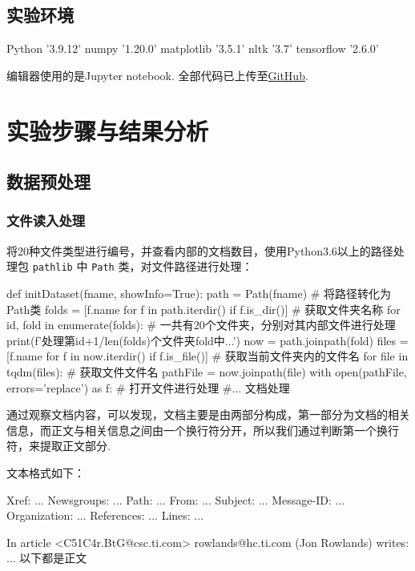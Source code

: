 \documentclass[12pt, a4paper, oneside]{ctexart}
\numberwithin{equation}{section}  %
\begin{document}
\subsection{实验环境}

\begin{pythoncode}
Python      '3.9.12'
numpy       '1.20.0'
matplotlib  '3.5.1'
nltk        '3.7'
tensorflow  '2.6.0'
\end{pythoncode}

编辑器使用的是Jupyter notebook.
全部代码已上传至\href{https://github.com/wty-yy/LaTex-Projects/blob/main/NLP/hw2/code/main.ipynb}{GitHub}.
\section{实验步骤与结果分析}
\subsection{数据预处理}
\subsubsection{文件读入处理}
将20种文件类型进行编号，并查看内部的文档数目，使用Python3.6以上的路径处理包
\texttt{pathlib} 中 \texttt{Path} 类，对文件路径进行处理：
\begin{pythoncode}
def initDataset(fname, showInfo=True):
    path = Path(fname)  # 将路径转化为Path类
    folds = [f.name for f in path.iterdir() if f.is_dir()]  # 获取文件夹名称
    for id, fold in enumerate(folds):  # 一共有20个文件夹，分别对其内部文件进行处理
        print(f'处理第{id+1}/{len(folds)}个文件夹{fold}中...')
        now = path.joinpath(fold)
        files = [f.name for f in now.iterdir() if f.is_file()]  # 获取当前文件夹内的文件名
        for file in tqdm(files):  # 获取文件文件名
            pathFile = now.joinpath(file)
            with open(pathFile, errors='replace') as f:  # 打开文件进行处理
            #... 文档处理
\end{pythoncode}

通过观察文档内容，可以发现，文档主要是由两部分构成，第一部分为文档的相关信息，而正文与相关信息之间由一个换行符分开，所以我们通过判断第一个换行符，来提取正文部分.

文本格式如下：
\begin{pythoncode}
Xref: ...
Newsgroups: ...
Path: ...
From: ...
Subject: ...
Message-ID: ...
Organization: ...
References: ...
Lines: ...

In article <C51C4r.BtG@csc.ti.com> rowlands@hc.ti.com (Jon Rowlands) writes:
... 以下都是正文
\end{pythoncode}
\end{document}
